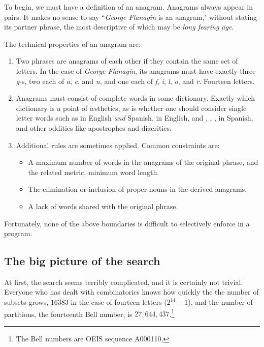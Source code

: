 \documentclass[letterpaper, 11pt]{article}
\begin{document}
To begin, we must have a definition of an anagram. Anagrams
always appear in pairs.  It makes no sense to say ``\emph{George
Flanagin} is an anagram," without stating its partner phrase, the
most descriptive of which may be \emph{long fearing age}. 

The technical properties of an anagram are:

\begin{enumerate}
\item Two phrases are anagrams of each other if they contain the
same set of letters. In the case of \emph{George Flanagin}, its
anagrams must have exactly three \emph{g}-s, two each of \emph{a},
\emph{e}, and \emph{n}, and one each of \emph{f}, \emph{i}, \emph{l},
\emph{o}, and \emph{r}.  Fourteen letters.

\item Anagrams must consist of complete words in some dictionary.
Exactly which dictionary is a point of {\ae}sthetics, as is whether
one should consider single letter words such as  in English
\emph{and} Spanish,  in English, and , , ,  in Spanish,
and other oddities like apostrophes and diacritics.

\item Additional rules are sometimes applied. Common constraints are:

\begin{itemize}
\item A maximum number of words in the anagrams of the original phrase,
and the related metric, minimum word length.

\item The elimination or inclusion of proper nouns in the derived
anagrams.

\item A lack of words shared with the original phrase.
\end{itemize}
\end{enumerate}

Fortunately, none of the above boundaries is difficult to selectively
enforce in a program. 

\subsection{The big picture of the search}
\label{sec:bigpicture}

At first, the search seems terribly complicated, and it is certainly
not trivial. Everyone who has dealt with combinatorics knows how
quickly the the number of subsets grows, $16383$ in the case of
fourteen letters (\ie $2^{14}-1$), and the number of partitions, the fourteenth Bell
number, is $27,644,437$.\footnote{The Bell numbers are OEIS sequence
A000110, }
\end{document}
